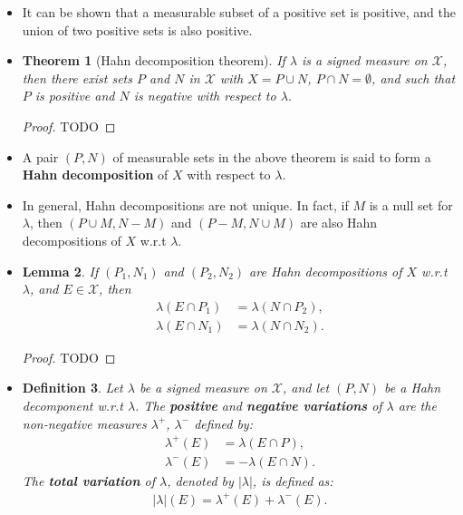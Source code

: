 \documentclass[10pt]{article}
\newtheorem{lemma}{Lemma}
\newtheorem{theorem}[lemma]{Theorem}
\newtheorem{definition}[lemma]{Definition}
\newcommand{\mcal}[1]{\mathcal{#1}}
\begin{document}
\begin{itemize}
  \item It can be shown that a measurable subset of a positive set is positive, and the union of two positive sets is also positive.
  
  \item \begin{theorem}[Hahn decomposition theorem]
    If $\lambda$ is a signed measure on $\mcal{X}$, then there exist sets $P$ and $N$ in $\mcal{X}$ with $X = P \cup N$, $P \cap N = \emptyset$, and such that $P$ is positive and $N$ is negative with respect to $\lambda$.
  \end{theorem}

  \begin{proof}
    TODO
  \end{proof}

  \item A pair $(P,N)$ of measurable sets in the above theorem is said to form a {\bf Hahn decomposition} of $X$ with respect to $\lambda$.
  
  \item In general, Hahn decompositions are not unique. In fact, if $M$ is a null set for $\lambda$, then $(P \cup M, N - M)$ and $(P - M, N \cup M)$ are also Hahn decompositions of $X$ w.r.t $\lambda$.
  
  \item \begin{lemma} \label{lemma:equivalence-of-hahn-decompositions}
    If $(P_1, N_1)$ and $(P_2, N_2)$ are Hahn decompositions of $X$ w.r.t $\lambda$, and $E \in \mcal{X}$, then
    \begin{align*}
      \lambda(E \cap P_1) &= \lambda(N \cap P_2), \\
      \lambda(E \cap N_1) &= \lambda(N \cap N_2).
    \end{align*}
  \end{lemma}

  \begin{proof}
    TODO
  \end{proof}

  \item \begin{definition}
    Let $\lambda$ be a signed measure on $\mcal{X}$, and let $(P,N)$ be a Hahn decomponent w.r.t $\lambda$. The {\bf positive} and {\bf negative variations} of $\lambda$ are the non-negative measures $\lambda^+$, $\lambda^-$ defined by:
    \begin{align*}
      \lambda^+(E) &= \lambda(E \cap P), \\
      \lambda^-(E) &= -\lambda(E \cap N).
    \end{align*}
    The {\bf total variation} of $\lambda$, denoted by $|\lambda|$, is defined as:
    \begin{align*}
      |\lambda|(E) = \lambda^+(E) + \lambda^-(E).
    \end{align*}
  \end{definition}


\end{itemize}
\end{document}
